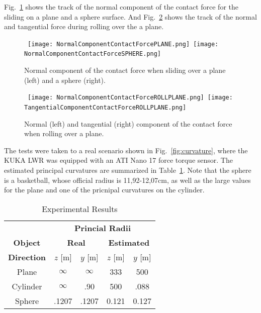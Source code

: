 Fig.~\ref{fig:NormCompContForce} shows the track of the normal component of the contact force for the sliding on a plane and a sphere surface. And Fig.~\ref{fig:TangCompForce} shows the track of the normal and tangential force during rolling over the a plane.

\begin{figure}[!t]
\centering
\mbox{
\texttt{[image: NormalComponentContactForcePLANE.png]}
\texttt{[image: NormalComponentContactForceSPHERE.png]}
}
\caption{Normal component of the contact force when sliding over a plane (left) and a sphere (right).}
\label{fig:NormCompContForce}
\end{figure}

\begin{figure}[!t]
\centering
\mbox{
\texttt{[image: NormalComponentContactForceROLLPLANE.png]}
\texttt{[image: TangentialComponentContactForceROLLPLANE.png]}
}
\caption{Normal (left) and tangential (right) component of the contact force when rolling over a plane.}
\label{fig:TangCompForce}
\end{figure}

The tests were taken to a real scenario shown in Fig.~\ref{fig:curvature}, where the KUKA LWR was equipped with an ATI Nano 17 force torque sensor. The estimated principal curvatures are summarized in Table~\ref{tab:results}. Note that the sphere is a basketball, whose official radius is 11,92-12,07cm, as well as the large values for the plane and one of the pricnipal curvatures on the cylinder.

\begin{table}
\centering
\caption{Experimental Results}
\label{tab:results}
\begin{tabular}{ccccc}
    \toprule
    & \multicolumn{4}{c}{\textbf{Princial Radii}}\\
    \textbf{Object} & \multicolumn{2}{c}{\textbf{Real}} & \multicolumn{2}{c}{\textbf{Estimated}}\\
    \textbf{Direction} & $z$ [m] & $y$ [m] & $z$ [m] & $y$ [m]\\
    \toprule
    Plane & $\infty$ & $\infty$ & 333 & 500 \\
    Cylinder & $\infty$ & .90 & 500 & .088 \\
    Sphere & .1207 & .1207 & 0.121 & 0.127 \\
    \bottomrule
\end{tabular}
\end{table}

